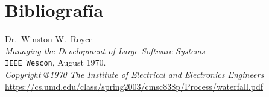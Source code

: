 \documentclass{beamer}
\begin{document}
\section{Bibliografía}

\begin{frame}[fragile]
\begin{thebibliography}{9}
  \footnotesize
  Dr.\ Winston W.\ Royce \\
  \emph{Managing the Development of Large Software Systems} \\
  \texttt{IEEE Wescon},
  August 1970. \\
  \textit{Copyright ®1970 The Institute of Electrical and Electronics Engineers} \\
  {\scriptsize\url{https://cs.umd.edu/class/spring2003/cmsc838p/Process/waterfall.pdf}}
\end{thebibliography}
\end{frame}
\end{document}
